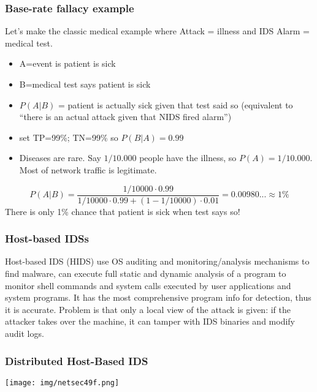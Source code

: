 \documentclass[a4paper, 10pt, titlepage]{article}
\begin{document}
\subsubsection*{Base-rate fallacy example}
Let's make the classic medical example where Attack = illness and IDS Alarm = medical test.
\begin{itemize}
	\item A=event is patient is sick
	\item B=medical test says patient is sick
	\item $P(A|B)$ = patient is actually sick given that test said so (equivalent to “there is an actual attack given that NIDS fired alarm”)
	\item set TP=99\%; TN=99\% so $P(B|A) = 0.99$
	\item Diseases are rare. Say $1/10.000$ people have the illness, so $P(A)=1/10.000$. Most of network traffic is legitimate.
\end{itemize}
$$P(A|B)= \dfrac{1/10000 \cdot 0.99}{1/10000 \cdot 0.99 + (1- 1/10000) \cdot 0.01} = 0.00980... \approx 1 \%$$
There is only 1\% chance that patient is sick when test says so!

\subsubsection*{Host-based IDSs}
Host-based IDS (HIDS) use OS auditing and monitoring/analysis mechanisms to find malware, can execute full static and dynamic analysis of a program to monitor shell commands and system calls executed by user applications and system programs. It has the most comprehensive program info for detection, thus it is accurate. Problem is that only a local view of the attack is given: if the attacker takes over the machine, it can tamper with IDS binaries and modify audit logs.

\subsubsection*{Distributed Host-Based IDS}
\begin{center}
	\texttt{[image: img/netsec49f.png]}
\end{center}
\end{document}

